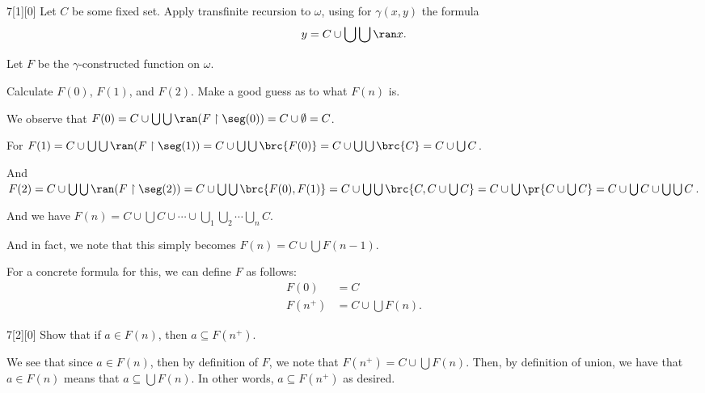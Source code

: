 \documentclass{article}
\begin{document}
\begin{hw}{7}[1][0]
	Let $C$ be some fixed set. Apply transfinite recursion to $\omega$, using for $\gamma(x, y)$ the formula
	\begin{equation*}
		y = C \cup \bigcup\bigcup \ran x.
	\end{equation*}

	Let $F$ be the $\gamma$-constructed function on $\omega$.
	
	Calculate $F(0)$, $F(1)$, and $F(2)$. Make a good guess as to what $F(n)$ is.
\end{hw}
\begin{solution}
	We observe that $F(0) = C \cup \bigcup\bigcup \ran (F\restriction \seg(0)) = C \cup \emptyset = C$.
	
	For $F(1) = C \cup \bigcup\bigcup \ran (F\restriction \seg(1)) = C \cup \bigcup\bigcup \brc{F(0)} = C \cup \bigcup\bigcup \brc{C} = C \cup \bigcup C$.
	
	And $F(2) = C \cup \bigcup\bigcup \ran(F \restriction \seg(2)) = C \cup \bigcup\bigcup \brc{F(0), F(1)} = C \cup \bigcup\bigcup \brc{C, C \cup \bigcup C} = C \cup \bigcup\pr{C \cup \bigcup C} = C \cup \bigcup C \cup \bigcup\bigcup C$.
	
	And we have $F(n) = C \cup \bigcup C \cup \cdots \cup \bigcup_1\bigcup_2\cdots\bigcup_n C$.
	
	And in fact, we note that this simply becomes $F(n) = C \cup \bigcup F(n-1)$.
	
	For a concrete formula for this, we can define $F$ as follows:
	\begin{align*}
		F(0) &= C \\
		F(n^{+}) &= C \cup \bigcup F(n).
	\end{align*}
\end{solution}

\begin{hw}{7}[2][0]
	Show that if $a \in F(n)$, then $a \subseteq F(n^{+})$.
\end{hw}
\begin{solution}
	We see that since $a \in F(n)$, then by definition of $F$, we note that $F(n^{+}) = C \cup \bigcup F(n)$. Then, by definition of union, we have that $a \in F(n)$ means that $a \subseteq \bigcup F(n)$. In other words, $a \subseteq F(n^{+})$ as desired.
\end{solution}
\end{document}
